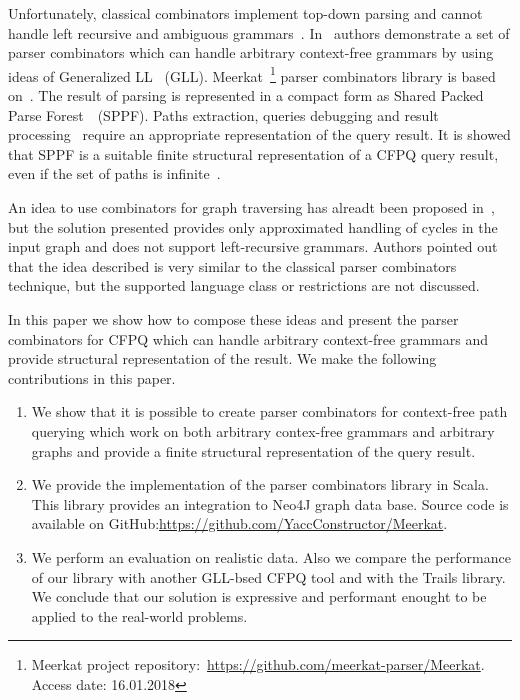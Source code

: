 Unfortunately, classical combinators implement top-down parsing and cannot handle left recursive and ambiguous grammars~\cite{!!!}.
In~\cite{Meerkat} authors demonstrate a set of parser combinators which can handle arbitrary context-free grammars by using ideas of Generalized LL~\cite{scott2010gll} (GLL).
Meerkat~\footnote{Meerkat project repository:~\url{https://github.com/meerkat-parser/Meerkat}. Access date: 16.01.2018} parser combinators library is based on~\cite{Meerkat}. The result of parsing is represented in a compact form as Shared Packed Parse Forest~\cite{SPPF}~(SPPF).
Paths extraction, queries debugging and result processing~\cite{structForDebugging} require an appropriate representation of the query result. It is showed that SPPF is a suitable finite structural representation of a CFPQ query result, even if the set of paths is infinite~\cite{GrigorevR16}. 

An idea to use combinators for graph traversing has alreadt been proposed in~\cite{ScalaGraphParsing}, but the solution presented provides only approximated handling of cycles in the input graph and does not support left-recursive grammars. 
Authors pointed out that the idea described is very similar to the classical parser combinators technique, but the supported language class or restrictions are not discussed.

In this paper we show how to compose these ideas and present the parser combinators for CFPQ which can handle arbitrary context-free grammars and provide structural representation of the result.
We make the following contributions in this paper.

\begin{enumerate}
\item We show that it is possible to create parser combinators for context-free path querying which work on both arbitrary contex-free grammars and arbitrary graphs and provide a finite structural representation of the query result.
\item We provide the implementation of the parser combinators library in Scala. This library provides an integration to Neo4J graph data base. Source code is available on GitHub:\url{https://github.com/YaccConstructor/Meerkat}.
\item We perform an evaluation on realistic data. 
Also we compare the performance of our library with another GLL-bsed CFPQ tool and with the Trails library.
We conclude that our solution is expressive and performant enought to be applied to the real-world problems. 
\end{enumerate}